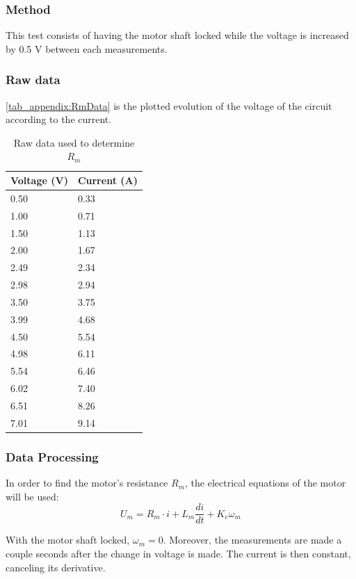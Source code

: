 \subsubsection*{Method}
This test consists of having the motor shaft locked while the voltage is increased by 0.5 V between each measurements.

\subsubsection*{Raw data}
\autoref{tab_appendix:RmData} is the plotted evolution of the voltage of the circuit according to the current.

\begin{table}[htbp]
	\centering
	\caption{Raw data used to determine $R_m$}\label{tab_appendix:RmData}
	\begin{tabularx}{0.35\textwidth}{XX}
		Voltage (V) & Current (A)\\ \toprule \rowcolor{lightGrey}
		0.50 & 0.33 \\
		1.00 & 0.71 \\ \rowcolor{lightGrey}
		1.50 & 1.13 \\
		2.00 & 1.67 \\ \rowcolor{lightGrey}
		2.49 & 2.34 \\
		2.98 & 2.94 \\ \rowcolor{lightGrey}
		3.50 & 3.75 \\
		3.99 & 4.68 \\ \rowcolor{lightGrey}
		4.50 & 5.54 \\
		4.98 & 6.11 \\ \rowcolor{lightGrey}
		5.54 & 6.46 \\
		6.02 & 7.40 \\ \rowcolor{lightGrey}
		6.51 & 8.26 \\
		7.01 & 9.14 
	\end{tabularx}
\end{table}

\subsubsection{Data Processing}
In order to find the motor's resistance $R_m$, the electrical equations of the motor will be used:
\begin{equation}
	U_m = R_m \cdot i + L_m \frac{di}{dt} + K_e\omega_m
\end{equation}

With the motor shaft locked, $\omega_m = 0$. Moreover, the measurements are made a couple seconds after the change in voltage is made. The current is then constant, canceling its derivative. 


